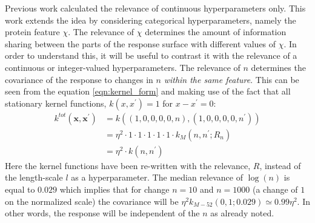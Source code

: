 
Previous work \cite{bergstrajamesbergstraRandomSearchHyperParameter2012} calculated the relevance of continuous hyperparameters only.  This work extends the idea by considering categorical hyperparameters, namely the protein feature $\chi$. The relevance of $\chi$ determines the amount of information sharing between the parts of the response surface with different values of $\chi$. In order to understand this, it will be useful to contrast it with  the relevance of a continuous or integer-valued hyperparameters.  The relevance of $n$ determines the covariance of the response to changes in $n$ \emph{within the same feature}. This can be seen from the equation \ref{eqn:kernel_form} and making use of the fact that all stationary kernel functions, $k(x, x^{\prime})=1$ for $x-x^{\prime}=0$:
\begin{equation*}
\begin{split}
    k^{tot}(\mathbf{x}, \mathbf{x}^{\prime})& = k\left((1, 0, 0, 0, 0, n), (1, 0, 0, 0, 0, n^{\prime})\right) \\
    & = \eta^{2}\cdot 1 \cdot 1\cdot 1 \cdot 1\cdot 1 \cdot k_{M}(n, n^{\prime}; R_{n}) \\
    & = \eta^{2}\cdot k(n, n^{\prime})
\end{split}
\end{equation*}
Here the kernel functions have been re-written with the relevance, $R$, instead of the length-scale $l$ as a hyperparameter. The median relevance of $\log{(n)}$ is equal to $\num{0.029}$ which implies that for change $n=10$ and $n=1000$ (a change of $1$ on the normalized scale) the covariance will be $\eta^{2}k_{M-52}(0,1; 0.029) \simeq 0.99\eta^{2}$. In other words, the response will be independent of the $n$ as already noted. 

